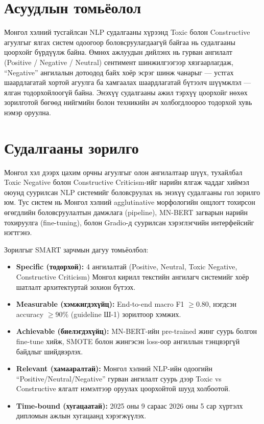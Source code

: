 \section{Асуудлын томьёолол}

Монгол хэлний тусгайлсан NLP судалгааны хүрээнд Toxic болон Constructive
агуулгыг ялгах систем одоогоор боловсруулагдаагүй байгаа нь судалгааны
цоорхойг бүрдүүлж байна. Өмнөх ажлуудын дийлэнх нь гурван ангилалт
(Positive / Negative / Neutral) сентимент шинжилгээгээр хязгаарлагдаж,
``Negative'' ангилалын дотоодод байх хоёр эсрэг шинж чанарыг --- устгах
шаардлагатай хортой агуулга ба хамгаалах шаардлагатай бүтээлч шүүмжлэл ---
ялган тодорхойлоогүй байна. Энэхүү судалгааны ажил тэрхүү цоорхойг нөхөх
зорилготой бөгөөд нийгмийн болон техникийн ач холбогдлоороо тодорхой хувь
нэмэр оруулна.

\section{Судалгааны зорилго}

Монгол хэл дээрх цахим орчны агуулгыг олон ангилалтаар шүүх, тухайлбал Toxic
Negative болон Constructive Criticism-ийг нарийн ялгаж чаддаг хиймэл оюунд суурилсан
NLP системийг боловсруулах нь энэхүү судалгааны гол зорилго юм. Тус систем нь
Монгол хэлний agglutinative морфологийн онцлогт тохирсон өгөгдлийн
боловсруулалтын дамжлага (pipeline), MN-BERT загварын нарийн тохируулга
(fine-tuning), болон Gradio-д суурилсан хэрэглэгчийн интерфейсийг нэгтгэнэ.

Зорилгыг SMART зарчмын дагуу томьёолбол:

\begin{itemize}
  \item \textbf{Specific (тодорхой):} 4 ангилалтай (Positive, Neutral, Toxic
    Negative, Constructive Criticism) Монгол кирилл текстийн ангилагч
    системийг хоёр шатлалт архитектуртай зохион бүтээх.
  \item \textbf{Measurable (хэмжигдэхүйц):} End-to-end macro F1 $\geq 0.80$,
    нэгдсэн accuracy $\geq 90\%$ (guideline Ш-1) зорилтоор хэмжих.
  \item \textbf{Achievable (биелэгдэхүйц):} MN-BERT-ийн pre-trained жинг
    суурь болгон fine-tune хийж, SMOTE болон жингэсэн loss-оор ангиллын
    тэнцвэргүй байдлыг шийдвэрлэх.
  \item \textbf{Relevant (хамааралтай):} Монгол хэлний NLP-ийн одоогийн
    ``Positive/Neutral/Negative'' гурван ангилалт суурь дээр Toxic vs
    Constructive ялгалт нэмэлтээр оруулах цоорхойтой шууд холбоотой.
  \item \textbf{Time-bound (хугацаатай):} 2025 оны 9 сараас 2026 оны 5 сар
    хүртэлх дипломын ажлын хугацаанд хэрэгжүүлэх.
\end{itemize}

